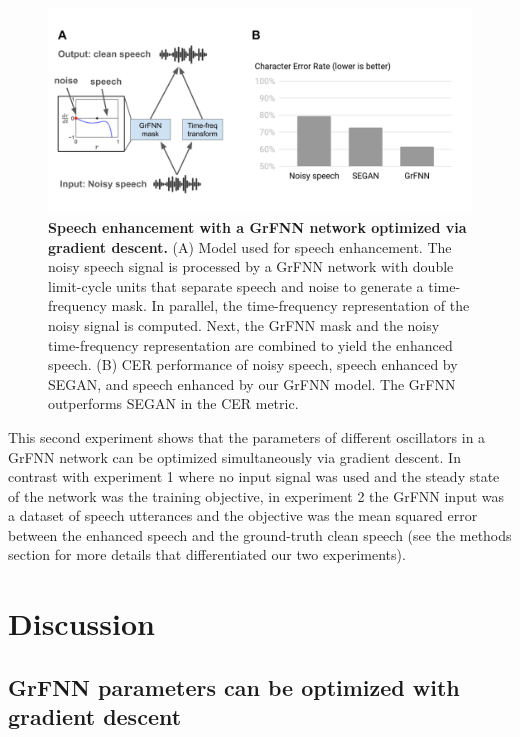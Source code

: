 \documentclass{report}
\begin{document}
\begin{figure}
    \centering
    \includegraphics[width=1.0\textwidth]{figures/fig5_2.png}
    \caption[Speech enhancement with a GrFNN network optimized via gradient descent]{\textbf{Speech enhancement with a GrFNN network optimized via gradient descent.} (A) Model used for speech enhancement. The noisy speech signal is processed by a GrFNN network with double limit-cycle units that separate speech and noise to generate a time-frequency mask. In parallel, the time-frequency representation of the noisy signal is computed. Next, the GrFNN mask and the noisy time-frequency representation are combined to yield the enhanced speech. (B) CER performance of noisy speech, speech enhanced by SEGAN, and speech enhanced by our GrFNN model. The GrFNN outperforms SEGAN in the CER metric.}
    \label{f5_2}
\end{figure}

This second experiment shows that the parameters of different oscillators in a GrFNN network can be optimized simultaneously via gradient descent. In contrast with experiment 1 where no input signal was used and the steady state of the network was the training objective, in experiment 2 the GrFNN input was a dataset of speech utterances and the objective was the mean squared error between the enhanced speech and the ground-truth clean speech (see the methods section for more details that differentiated our two experiments). 

\section{Discussion}

\subsection{GrFNN parameters can be optimized with gradient descent}
\end{document}
